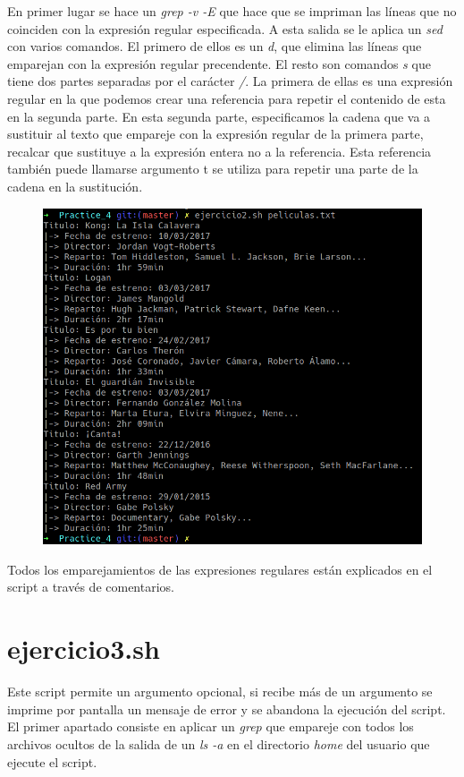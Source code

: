 \documentclass[12pt,a4paper]{article}
\begin{document}
En primer lugar se hace un \emph{grep -v -E} que hace que se impriman las líneas que no coinciden con la expresión regular especificada. A esta salida se le aplica un \emph{sed} con varios comandos. El primero de ellos es un \emph{d}, que elimina las líneas que emparejan con la expresión regular precendente. El resto son comandos \emph{s} que tiene dos partes separadas por el carácter \emph{/}. La primera de ellas es una expresión regular en la que podemos crear una referencia para repetir el contenido de esta en la segunda parte. En esta segunda parte, especificamos la cadena que va a sustituir al texto que empareje con la expresión regular de la primera parte, recalcar que sustituye a la expresión entera no a la referencia. Esta referencia también puede llamarse argumento t se utiliza para repetir una parte de la cadena en la sustitución.

\begin{figure}[ht]
	\centering
	\includegraphics[width=1\textwidth]{images/ejercicio2.png}
\end{figure}

Todos los emparejamientos de las expresiones regulares están explicados en el script a través de comentarios.

\newpage

\section{ejercicio3.sh}
Este script permite un argumento opcional, si recibe más de un argumento se imprime por pantalla un mensaje de error y se abandona la ejecución del script. El primer apartado consiste en aplicar un \emph{grep} que empareje con todos los archivos ocultos de la salida de un \emph{ls -a} en el directorio \emph{home} del usuario que ejecute el script.
\end{document}
